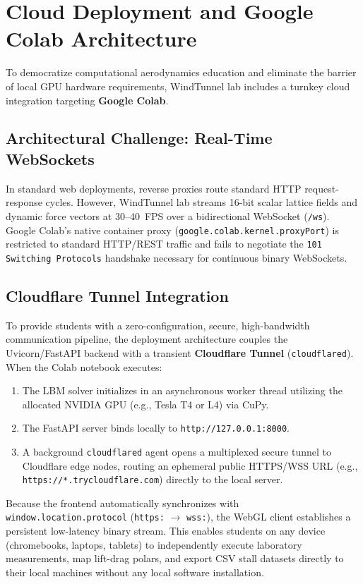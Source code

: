 \documentclass[11pt,a4paper]{article}
\begin{document}
\section{Cloud Deployment and Google Colab Architecture}

To democratize computational aerodynamics education and eliminate the barrier of local GPU hardware requirements, WindTunnel lab includes a turnkey cloud integration targeting \textbf{Google Colab}.

\subsection{Architectural Challenge: Real-Time WebSockets}
In standard web deployments, reverse proxies route standard HTTP request-response cycles. However, WindTunnel lab streams 16-bit scalar lattice fields and dynamic force vectors at 30--40~FPS over a bidirectional WebSocket (\texttt{/ws}). Google Colab's native container proxy (\texttt{google.colab.kernel.proxyPort}) is restricted to standard HTTP/REST traffic and fails to negotiate the \texttt{101 Switching Protocols} handshake necessary for continuous binary WebSockets.

\subsection{Cloudflare Tunnel Integration}
To provide students with a zero-configuration, secure, high-bandwidth communication pipeline, the deployment architecture couples the Uvicorn/FastAPI backend with a transient \textbf{Cloudflare Tunnel} (\texttt{cloudflared}). When the Colab notebook executes:
\begin{enumerate}
    \item The LBM solver initializes in an asynchronous worker thread utilizing the allocated NVIDIA GPU (e.g., Tesla T4 or L4) via CuPy.
    \item The FastAPI server binds locally to \texttt{http://127.0.0.1:8000}.
    \item A background \texttt{cloudflared} agent opens a multiplexed secure tunnel to Cloudflare edge nodes, routing an ephemeral public HTTPS/WSS URL (e.g., \texttt{https://*.trycloudflare.com}) directly to the local server.
\end{enumerate}
Because the frontend automatically synchronizes with \texttt{window.location.protocol} (\texttt{https:} $\to$ \texttt{wss:}), the WebGL client establishes a persistent low-latency binary stream. This enables students on any device (chromebooks, laptops, tablets) to independently execute laboratory measurements, map lift-drag polars, and export CSV stall datasets directly to their local machines without any local software installation.
\end{document}
